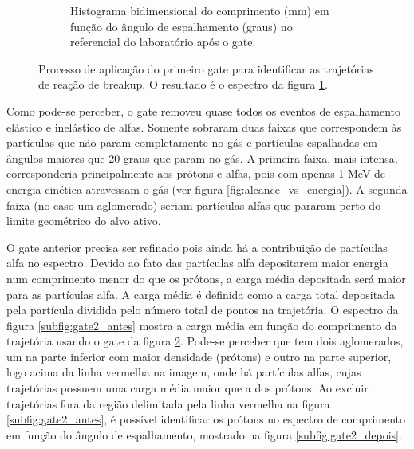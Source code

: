 \documentclass[a4paper,12pt,oneside]{book}
\begin{document}
\begin{figure}[H]
\begin{subfigure}[b]{\textwidth}
        \caption{Histograma bidimensional do comprimento (mm) em função do ângulo de espalhamento (graus) no referencial do laboratório após o gate.}
        \label{subfig:comp_vs_carga_cut1}
    \end{subfigure}%
    \hfill
\caption{Processo de aplicação do primeiro gate para identificar as trajetórias de reação de breakup. O resultado é o espectro da figura \ref{subfig:comp_vs_carga_cut1}.}
\label{fig:gate_1}
\end{figure}

\par Como pode-se perceber, o gate removeu quase todos os eventos de espalhamento elástico e inelástico de alfas. Somente sobraram duas faixas que correspondem às partículas que não param completamente no gás e partículas espalhadas em ângulos maiores que 20 graus que param no gás. A primeira faixa, mais intensa, corresponderia principalmente aos prótons e alfas, pois com apenas 1 MeV de energia cinética atravessam o gás (ver figura \ref{fig:alcance_vs_energia}). A segunda faixa (no caso um aglomerado) seriam partículas alfas que pararam perto do limite geométrico do alvo ativo.


\par O gate anterior precisa ser refinado pois ainda há a contribuição de partículas alfa no espectro. Devido ao fato das partículas alfa depositarem maior energia num comprimento menor do que os prótons, a carga média depositada será maior para as partículas alfa. A carga média é definida como a carga total depositada pela partícula dividida pelo número total de pontos na trajetória. O espectro da figura \ref{subfig:gate2_antes} mostra a carga média em função do comprimento da trajetória usando o gate da figura \ref{fig:gate_1}. Pode-se perceber que tem dois aglomerados, um na parte inferior com maior densidade (prótons) e outro na parte superior, logo acima da linha vermelha na imagem, onde há partículas alfas, cujas trajetórias possuem uma carga média maior que a dos prótons. Ao excluir trajetórias fora da região delimitada pela linha vermelha na figura \ref{subfig:gate2_antes}, é possível identificar os prótons no espectro de comprimento em função do ângulo de espalhamento, mostrado na figura \ref{subfig:gate2_depois}.


\end{document}
